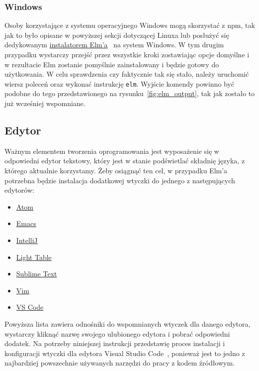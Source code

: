 \documentclass[twoside,a4paper]{report}
\begin{document}
\subsubsection{Windows}
Osoby korzystające z systemu operacyjnego Windows mogą skorzystać z npm, tak jak to było opisane w powyższej sekcji dotyczącej Linuxa lub posłużyć się dedykowanym \href{https://github.com/elm/compiler/releases/download/0.19.1/installer-for-windows.exe}{instalatorem Elm'a}~\cite{elm_installer} na system Windows.
W tym drugim przypadku wystarczy przejść przez wszystkie kroki zostawiając opcje domyślne i w rezultacie Elm zostanie pomyślnie zainstalowany i będzie gotowy do użytkowania.
W celu sprawdzenia czy faktycznie tak się stało, należy uruchomić wiersz poleceń oraz wykonać instrukcję \texttt{elm}.
Wyjście komendy powinno być podobne do tego przedstawionego na rysunku~\ref{fig:elm_output}, tak jak zostało to już wcześniej wspomniane.

\subsection{Edytor}
Ważnym elementem tworzenia oprogramowania jest wyposażenie się w odpowiedni edytor tekstowy, który jest w stanie podświetlać składnię języka, z którego aktualnie korzystamy.
Żeby osiągnąć ten cel, w przypadku Elm'a potrzebna będzie instalacja dodatkowej wtyczki do jednego z następujących edytorów:

\begin{itemize}[noitemsep,topsep=0pt]
    \item{\href{https://atom.io/packages/language-elm}{Atom}}
    \item{\href{https://github.com/jcollard/elm-mode}{Emacs}}
    \item{\href{https://github.com/klazuka/intellij-elm}{IntelliJ}}
    \item{\href{https://github.com/rundis/elm-light}{Light Table}}
    \item{\href{https://github.com/evancz/elm-syntax-highlighting/}{Sublime Text}}
    \item{\href{https://github.com/elm-tooling/elm-vim}{Vim}}
    \item{\href{https://github.com/elm-tooling/elm-language-client-vscode}{VS Code}}
\end{itemize}

Powyższa lista zawiera odnośniki do wspomnianych wtyczek dla danego edytora, wystarczy kliknąć nazwę swojego ulubionego edytora i pobrać odpowiedni dodatek.
Na potrzeby niniejszej instrukcji przedstawię proces instalacji i konfiguracji wtyczki dla edytora Visual Studio Code~\cite{vscode}, ponieważ jest to jedno z najbardziej powszechnie używanych narzędzi do pracy z kodem źródłowym.
\end{document}
